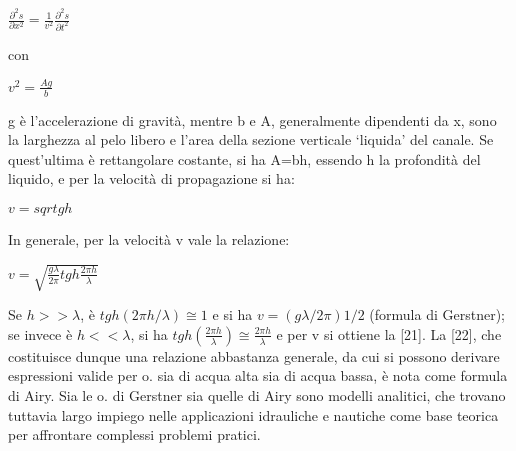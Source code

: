 \documentclass[a4paper]{article}
\begin{document}
$\frac{\partial^2 s}{\partial x^2}=\frac{1}{v^2}\frac{\partial^2 s}{\partial t^2}$

con

$v^2=\frac{Ag}{b}$

g è l’accelerazione di gravità, mentre b e A, generalmente dipendenti da x, sono la larghezza al pelo libero e l’area della sezione verticale ‘liquida’ del canale. Se quest’ultima è rettangolare costante, si ha A=bh, essendo h la profondità del liquido, e per la velocità di propagazione si ha: 

$v=sqrt{gh}$

In generale, per la velocità v vale la relazione: 

$v=\sqrt{\frac{g\lambda}{2\pi} tgh \frac{2\pi h}{\lambda}}$

Se $h>>\lambda$, è $tgh(2\pi h/\lambda)\cong 1$ e si ha $v=(g\lambda/2\pi )1/2$ (formula di Gerstner); se invece è $h<<\lambda$, si ha $tgh(\frac{2\pi h}{\lambda})\cong \frac{2\pi h}{\lambda}$ e per v si ottiene la [21]. La [22], che costituisce dunque una relazione abbastanza generale, da cui si possono derivare espressioni valide per o. sia di acqua alta sia di acqua bassa, è nota come formula di Airy. Sia le o. di Gerstner sia quelle di Airy sono modelli analitici, che trovano tuttavia largo impiego nelle applicazioni idrauliche e nautiche come base teorica per affrontare complessi problemi pratici. 
\end{document}
